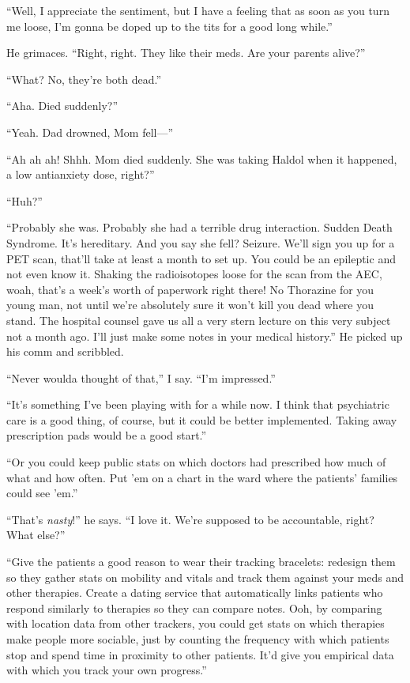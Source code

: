 “Well, I appreciate the sentiment, but I have a feeling that as
soon as you turn me loose, I’m gonna be doped up to the tits for a
good long while.”

He grimaces. “Right, right. They like their meds. Are your parents
alive?”

“What? No, they’re both dead.”

“Aha. Died suddenly?”

“Yeah. Dad drowned, Mom fell—”

“Ah ah ah! Shhh. Mom died suddenly. She was taking Haldol when it
happened, a low antianxiety dose, right?”

“Huh?”

“Probably she was. Probably she had a terrible drug interaction.
Sudden Death Syndrome. It’s hereditary. And you say she fell?
Seizure. We’ll sign you up for a PET scan, that’ll take at least a
month to set up. You could be an epileptic and not even know it.
Shaking the radioisotopes loose for the scan from the AEC, woah,
that’s a week’s worth of paperwork right there! No Thorazine for
you young man, not until we’re absolutely sure it won’t kill you
dead where you stand. The hospital counsel gave us all a very stern
lecture on this very subject not a month ago. I’ll just make some
notes in your medical history.” He picked up his comm and
scribbled.

“Never woulda thought of that,” I say. “I’m impressed.”

“It’s something I’ve been playing with for a while now. I think
that psychiatric care is a good thing, of course, but it could be
better implemented. Taking away prescription pads would be a good
start.”

“Or you could keep public stats on which doctors had prescribed how
much of what and how often. Put ’em on a chart in the ward where
the patients’ families could see ’em.”

“That’s \emph{nasty}!” he says. “I love it. We’re supposed to be
accountable, right? What else?”

“Give the patients a good reason to wear their tracking bracelets:
redesign them so they gather stats on mobility and vitals and track
them against your meds and other therapies. Create a dating service
that automatically links patients who respond similarly to
therapies so they can compare notes. Ooh, by comparing with
location data from other trackers, you could get stats on which
therapies make people more sociable, just by counting the frequency
with which patients stop and spend time in proximity to other
patients. It’d give you empirical data with which you track your
own progress.”

